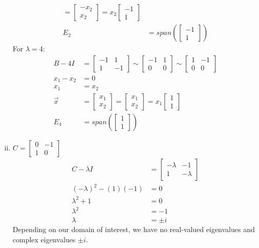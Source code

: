 \documentclass[letterpaper, 12pt]{math}
\begin{document}
\begin{enumerate}[(i)]
\begin{align*}
      = \begin{bmatrix}-x_2 \\ x_2\end{bmatrix}
      = x_2\begin{bmatrix}-1 \\ 1\end{bmatrix} \\
    E_2 &= span\left(\begin{bmatrix}-1 \\ 1\end{bmatrix}\right)
  \end{align*}
  For \( \lambda = 4 \):
  \begin{align*}
    B-4I &= \begin{bmatrix}-1 & 1 \\ 1 & -1\end{bmatrix}
      \sim \begin{bmatrix}-1 & 1 \\ 0 & 0\end{bmatrix}
      \sim \begin{bmatrix}1 & -1 \\ 0 & 0\end{bmatrix} \\
    x_1-x_2 &= 0 \\
    x_1 &= x_2 \\
    \vec{x} &= \begin{bmatrix}x_1 \\ x_2\end{bmatrix}
      = \begin{bmatrix}x_1 \\ x_2\end{bmatrix}
      = x_1\begin{bmatrix}1 \\ 1\end{bmatrix} \\
    E_4 &= span\left(\begin{bmatrix}1 \\ 1\end{bmatrix}\right)
  \end{align*}
  \item \( C = \begin{bmatrix}0 & -1 \\ 1 & 0\end{bmatrix} \)
  \begin{align*}
    C-\lambda I &= \begin{bmatrix}
      -\lambda & -1 \\
      1 & -\lambda
    \end{bmatrix} \\
    (-\lambda)^2-(1)(-1) &= 0 \\
    \lambda^2+1 &= 0 \\
    \lambda^2 &= -1 \\
    \lambda &= \pm i
  \end{align*}
  Depending on our domain of interest, we have no real-valued eigenvalues and
  complex eigenvalues \( \pm i \).
\end{enumerate}
\end{document}
